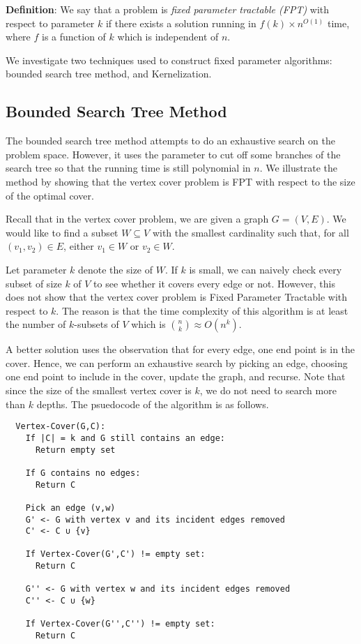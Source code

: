 \documentclass{article}
\begin{document}
\textbf{Definition}:
We say that a problem is \emph{fixed parameter tractable (FPT)} with respect to parameter $k$ if there exists
a solution running in $f(k)\times n^{O(1)}$ time, where $f$ is a function of $k$ which is independent of
$n$.

We investigate two techniques used to construct fixed parameter algorithms: bounded search tree method, 
and Kernelization.

\subsection{Bounded Search Tree Method}
The bounded search tree method attempts to do an exhaustive search on the problem space. However,
it uses the parameter to cut off some branches of the search tree so that the running time is still
polynomial in $n$. We illustrate the method by showing that the vertex cover problem is FPT
with respect to the size of the optimal cover.

Recall that in the vertex cover problem, we are given a graph $G = (V,E)$. We would like to
find a subset $W \subseteq V$ with the smallest cardinality such that, for all $(v_1, v_2) \in E$,
either $v_1 \in W$ or $v_2 \in W$.

Let parameter $k$ denote the size of $W$. If $k$ is small, we can naively check every subset
of size $k$ of $V$ to see whether it covers every edge or not. However, this does not show that the
vertex cover problem is Fixed Parameter Tractable with respect to $k$. The reason is that the time complexity
of this algorithm is at least the number of $k$-subsets of $V$ which is ${n \choose k}\approx O(n^k)$.

A better solution uses the observation that for every edge, one end point is in the cover. Hence,
we can perform an exhaustive search by picking an edge, choosing one end point to include in the
cover, update the graph, and recurse. Note that since the size of the smallest vertex cover is $k$, 
we do not need to search more than $k$ depths. The psuedocode of the algorithm is as follows.

\begin{lstlisting}
  Vertex-Cover(G,C):
    If |C| = k and G still contains an edge:
      Return empty set

    If G contains no edges:
      Return C

    Pick an edge (v,w)
    G' <- G with vertex v and its incident edges removed
    C' <- C ∪ {v}

    If Vertex-Cover(G',C') != empty set:
      Return C

    G'' <- G with vertex w and its incident edges removed
    C'' <- C ∪ {w}

    If Vertex-Cover(G'',C'') != empty set:
      Return C
\end{lstlisting}
\end{document}

